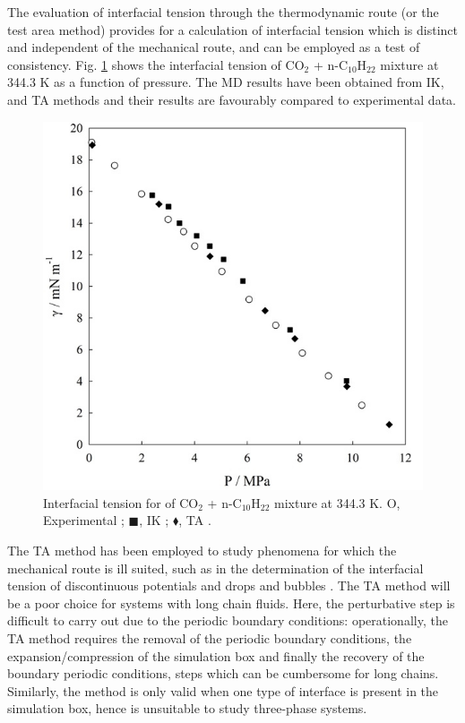 \documentclass[9pt,tutorial]{livecoms}
\begin{document}
The evaluation of interfacial tension through the thermodynamic route (or the
test area method) provides for a calculation of interfacial tension which is
distinct and independent of the mechanical route, and can be employed as a test
of consistency. Fig. \ref{fig:21} shows the interfacial tension of CO$_{2}$
+ n-C$_{10}$H$_{22}$ mixture at 344.3 K as a function of pressure. The MD
results have been obtained from IK, and TA methods and their results are
favourably compared to experimental data.
\begin{figure}
\includegraphics[width=0.8\linewidth]{gfx/image67.jpeg}
\caption{Interfacial tension for of CO$_{2}$ + n-C$_{10}$H$_{22}$ mixture at 344.3 K. O, Experimental \citep{mejia2014a}; ${\blacksquare}$, IK \citep{mejia2014a}; $\blacklozenge$, TA \citep{muller2009} .}
\label{fig:21}
\end{figure}
The TA method has been employed to study phenomena for which the mechanical route
is ill suited, such as in the determination of the interfacial tension of
discontinuous potentials \citep{gloor2005}
and drops and bubbles \citep{lau2015,sampayo2010}. The TA method will be a poor choice
for systems with long chain fluids. Here, the perturbative step is difficult to
carry out due to the periodic boundary conditions: operationally, the TA method
requires the removal of the periodic boundary conditions, the
expansion/compression of the simulation box and finally the recovery of the
boundary periodic conditions, steps which can be cumbersome for long chains.
Similarly, the method is only valid when one type of interface is present in the
simulation box, hence is unsuitable to study three-phase systems. 
\end{document}
